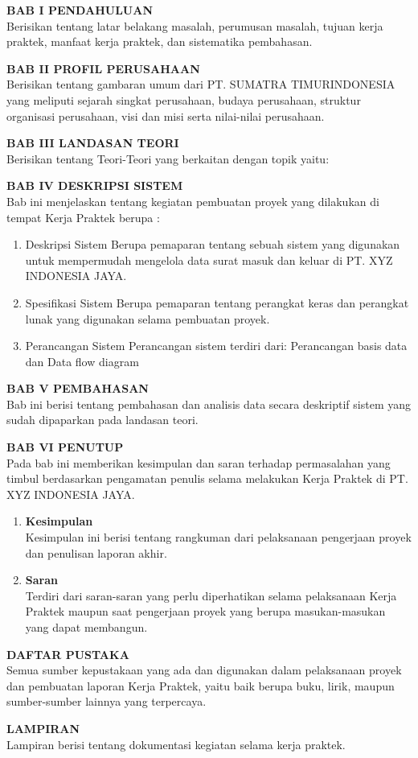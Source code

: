 \noindent \textbf{BAB I PENDAHULUAN} \\
Berisikan tentang latar belakang masalah, perumusan masalah, tujuan kerja praktek, manfaat kerja praktek, dan sistematika pembahasan.

\noindent \textbf{BAB II PROFIL PERUSAHAAN} \\
Berisikan tentang gambaran umum dari PT. SUMATRA TIMURINDONESIA yang meliputi sejarah singkat perusahaan, budaya perusahaan, struktur organisasi perusahaan, visi dan misi serta nilai-nilai perusahaan.

\noindent \textbf{BAB III LANDASAN TEORI} \\
Berisikan tentang Teori-Teori yang berkaitan dengan topik yaitu:

\noindent \textbf{BAB IV DESKRIPSI SISTEM} \\
Bab ini menjelaskan tentang kegiatan pembuatan proyek yang dilakukan di tempat Kerja Praktek berupa :
\begin{enumerate}
    \item Deskripsi Sistem Berupa pemaparan tentang sebuah sistem yang digunakan untuk mempermudah mengelola data surat masuk dan keluar di PT. XYZ INDONESIA JAYA.
    \item Spesifikasi Sistem Berupa pemaparan tentang perangkat keras dan perangkat lunak yang digunakan selama pembuatan proyek.
    \item Perancangan Sistem Perancangan sistem terdiri dari: Perancangan basis data dan Data flow diagram
\end{enumerate}

\noindent \textbf{BAB V PEMBAHASAN} \\
Bab ini berisi tentang pembahasan dan analisis data secara deskriptif sistem yang sudah dipaparkan pada landasan teori.

\noindent \textbf{BAB VI PENUTUP} \\
Pada bab ini memberikan kesimpulan dan saran terhadap permasalahan yang timbul berdasarkan pengamatan penulis selama melakukan Kerja Praktek di PT. XYZ INDONESIA JAYA.
\begin{enumerate}
    \item \textbf{Kesimpulan} \\
          Kesimpulan ini berisi tentang rangkuman dari pelaksanaan pengerjaan proyek dan penulisan laporan akhir.
    \item \textbf{Saran} \\
          Terdiri dari saran-saran yang perlu diperhatikan selama pelaksanaan Kerja Praktek maupun saat pengerjaan proyek yang berupa masukan-masukan yang dapat membangun.
\end{enumerate}

\noindent \textbf{DAFTAR PUSTAKA} \\
Semua sumber kepustakaan yang ada dan digunakan dalam pelaksanaan proyek dan pembuatan laporan Kerja Praktek, yaitu baik berupa buku, lirik, maupun sumber-sumber lainnya yang terpercaya.

\noindent \textbf{LAMPIRAN} \\
Lampiran berisi tentang dokumentasi kegiatan selama kerja praktek.

